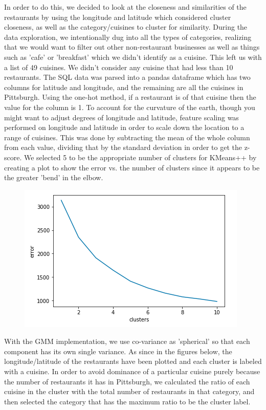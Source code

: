\documentclass{neu_handout}
\begin{document}
In order to do this, we decided to look at the closeness and similarities of the restaurants by using the longitude and latitude which considered cluster closeness, as well as the category/cuisines to cluster for similarity. During the data exploration, we intentionally dug into all the types of categories, realizing that we would want to filter out other non-restaurant businesses as well as things such as 'cafe' or 'breakfast' which we didn't identify as a cuisine. This left us with a list of 49 cuisines. We didn't consider any cuisine that had less than 10 restaurants. The SQL data was parsed into a pandas dataframe which has two columns for latitude and longitude, and the remaining are all the cuisines in Pittsburgh. Using the one-hot method, if a restaurant is of that cuisine then the value for the column is 1. To account for the curvature of the earth, though you might want to adjust degrees of longitude and latitude, feature scaling was performed on longitude and latitude in order to scale down the location to a range of cuisines. This was done by subtracting the mean of the whole column from each value, dividing that by the standard deviation in order to get the z-score. We selected 5 to be the appropriate number of clusters for KMeans++ by creating a plot to show the error vs. the number of clusters since it appears to be the greater 'bend' in the elbow.

\begin{figure}[h]
\centering
{
\includegraphics[width=0.4\linewidth]{kmeanserror}
}
\end{figure}

With the GMM implementation, we use co-variance as 'spherical' so that each component has its own single variance. As since in the figures below, the longitude/latitude of the restaurants have been plotted and each cluster is labeled with a cuisine. In order to avoid dominance of a particular cuisine purely because the number of restaurants it has in Pittsburgh, we calculated the ratio of each cuisine in the cluster with the total number of restaurants in that category, and then selected the category that has the maximum ratio to be the cluster label.
\end{document}
